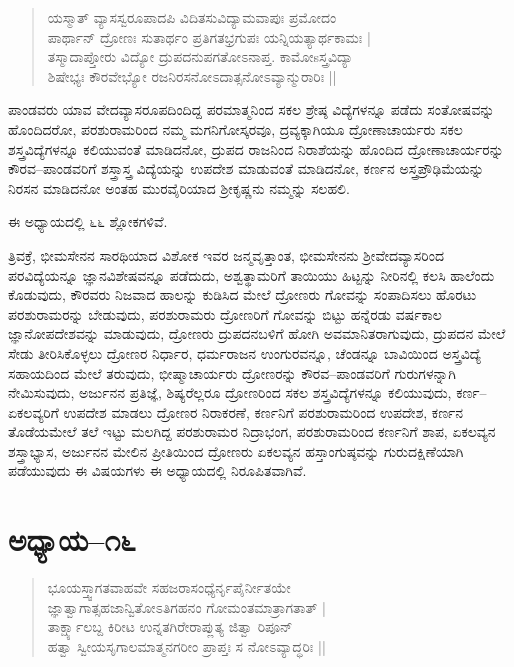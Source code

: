 \begin{verse}
ಯಸ್ಮಾತ್ ವ್ಯಾಸಸ್ವರೂಪಾದಪಿ ವಿದಿತಸುವಿದ್ಯಾಮವಾಪುಃ ಪ್ರಮೋದಂ\\ ಪಾರ್ಥಾನ್ ದ್ರೋಣಃ ಸುತಾರ್ಥಂ ಪ್ರತಿಗತಭ್ರಗುಪಃ ಯನ್ನಿಯತ್ಯಾರ್ಥಕಾಮಃ |\\ ತಸ್ಮಾದಾಪ್ತೋರು ವಿದ್ಯೋ ದ್ರುಪದನುಪಗತೋಽನಾಪ್ತ. ಕಾಮೋsಸ್ತ್ರವಿದ್ಯಾ \\ ಶಿಷೇಭ್ಯಃ ಕೌರವೇಭ್ಯೋ ರಜನಿರಸನೋಽದಾತ್ಸನೋಽವ್ಯಾನ್ಮುರಾರಿಃ ||
\end{verse}

ಪಾಂಡವರು ಯಾವ ವೇದವ್ಯಾಸರೂಪದಿಂದಿದ್ದ ಪರಮಾತ್ಮನಿಂದ ಸಕಲ ಶ್ರೇಷ್ಠ ವಿದ್ಯೆಗಳನ್ನೂ ಪಡೆದು ಸಂತೋಷವನ್ನು ಹೊಂದಿದರೋ, ಪರಶುರಾಮರಿಂದ ನಮ್ಮ ಮಗನಿಗೋಸ್ಕರವೂ, ದ್ರವ್ಯಕ್ಕಾಗಿಯೂ ದ್ರೋಣಾಚಾರ್ಯರು ಸಕಲ ಶಸ್ತ್ರವಿದ್ಯೆಗಳನ್ನೂ ಕಲಿಯುವಂತೆ ಮಾಡಿದನೋ, ದ್ರುಪದ ರಾಜನಿಂದ ನಿರಾಶೆಯನ್ನು ಹೊಂದಿದ ದ್ರೋಣಾಚಾರ್ಯರನ್ನು ಕೌರವ–ಪಾಂಡವರಿಗೆ ಶಸ್ತ್ರಾಸ್ತ್ರ ವಿದ್ಯೆಯನ್ನು ಉಪದೇಶ ಮಾಡುವಂತೆ ಮಾಡಿದನೋ, ಕರ್ಣನ ಅಸ್ತ್ರಪ್ರೌಢಿಮೆಯನ್ನು ನಿರಸನ ಮಾಡಿದನೋ ಅಂತಹ ಮುರವೈರಿಯಾದ ಶ‍್ರೀಕೃಷ್ಣನು ನಮ್ಮನ್ನು ಸಲಹಲಿ.

ಈ ಅಧ್ಯಾಯದಲ್ಲಿ ೬೬ ಶ್ಲೋಕಗಳಿವೆ.

ತ್ರಿವಕ್ರೆ, ಭೀಮಸೇನನ ಸಾರಥಿಯಾದ ವಿಶೋಕ ಇವರ ಜನ್ಮವೃತ್ತಾಂತ, ಭೀಮಸೇನನು ಶ‍್ರೀವೇದವ್ಯಾಸರಿಂದ ಪರವಿದ್ಯೆಯನ್ನೂ ಜ್ಞಾನವಿಶೇಷವನ್ನೂ ಪಡೆದುದು, ಅಶ್ವತ್ಥಾಮರಿಗೆ ತಾಯಿಯು ಹಿಟ್ಟನ್ನು ನೀರಿನಲ್ಲಿ ಕಲಸಿ ಹಾಲೆಂದು ಕೊಡುವುದು, ಕೌರವರು ನಿಜವಾದ ಹಾಲನ್ನು ಕುಡಿಸಿದ ಮೇಲೆ ದ್ರೋಣರು ಗೋವನ್ನು ಸಂಪಾದಿಸಲು ಹೊರಟು ಪರಶುರಾಮರನ್ನು ಬೇಡುವುದು, ಪರಶುರಾಮರು ದ್ರೋಣರಿಗೆ ಗೋವನ್ನು ಬಿಟ್ಟು ಹನ್ನೆರಡು ವರ್ಷಕಾಲ ಜ್ಞಾನೋಪದೇಶವನ್ನು ಮಾಡುವುದು, ದ್ರೋಣರು ದ್ರುಪದನಬಳಿಗೆ ಹೋಗಿ ಅವಮಾನಿತರಾಗುವುದು, ದ್ರುಪದನ ಮೇಲೆ ಸೇಡು ತೀರಿಸಿಕೊಳ್ಳಲು ದ್ರೋಣರ ನಿರ್ಧಾರ, ಧರ್ಮರಾಜನ ಉಂಗುರವನ್ನೂ, ಚೆಂಡನ್ನೂ ಬಾವಿಯಿಂದ ಅಸ್ತ್ರವಿದ್ಯೆ ಸಹಾಯದಿಂದ ಮೇಲೆ ತರುವುದು, ಭೀಷ್ಮಾಚಾರ್ಯರು ದ್ರೋಣರನ್ನು ಕೌರವ–ಪಾಂಡವರಿಗೆ ಗುರುಗಳನ್ನಾಗಿ ನೇಮಿಸುವುದು, ಅರ್ಜುನನ ಪ್ರತಿಜ್ಞೆ, ಶಿಷ್ಯರೆಲ್ಲರೂ ದ್ರೋಣರಿಂದ ಸಕಲ ಶಸ್ತ್ರವಿದ್ಯೆಗಳನ್ನೂ ಕಲಿಯುವುದು, ಕರ್ಣ–ಏಕಲವ್ಯರಿಗೆ ಉಪದೇಶ ಮಾಡಲು ದ್ರೋಣರ ನಿರಾಕರಣೆ, ಕರ್ಣನಿಗೆ ಪರಶುರಾಮರಿಂದ ಉಪದೇಶ, ಕರ್ಣನ ತೊಡೆಯಮೇಲೆ ತಲೆ ಇಟ್ಟು ಮಲಗಿದ್ದ ಪರಶುರಾಮರ ನಿದ್ರಾಭಂಗ, ಪರಶುರಾಮರಿಂದ ಕರ್ಣನಿಗೆ ಶಾಪ, ಏಕಲವ್ಯನ ಶಸ್ತ್ರಾಭ್ಯಾಸ, ಅರ್ಜುನನ ಮೇಲಿನ ಪ್ರೀತಿಯಿಂದ ದ್ರೋಣರು ಏಕಲವ್ಯನ ಹಸ್ತಾಂಗುಷ್ಠವನ್ನು ಗುರುದಕ್ಷಿಣೆಯಾಗಿ ಪಡೆಯುವುದು ಈ ವಿಷಯಗಳು ಈ ಅಧ್ಯಾಯದಲ್ಲಿ ನಿರೂಪಿತವಾಗಿವೆ.


\section{ಅಧ್ಯಾಯ–೧೬}

\begin{verse}
ಭೂಯಸ್ತ್ವಾಗತವಾಹವೇ ಸಹಜರಾಸಂಧ್ಯೆರ್ನೃಪೈರ್ನೀತಯೇ \\ಜ್ಞಾತ್ವಾಗಾತ್ಸಹಜಾನ್ವಿತೋಽತಿಗಹನಂ ಗೋಮಂತಮಾತ್ರಾಗತಾತ್ |\\ ತಾರ್ಕ್ಷ್ಯಾಲಬ್ದ ಕಿರೀಟ ಉನ್ನತಗಿರೇರಾಪ್ಲುತ್ಯ ಜಿತ್ವಾ ರಿಪೂನ್\\ ಹತ್ವಾ ಸ್ವೀಯಸೃಗಾಲಮಾತ್ಮನಗರೀಂ ಪ್ರಾಪ್ತಃ ಸ ನೋಽವ್ಯಾದ್ಧರಿಃ ||
\end{verse}

